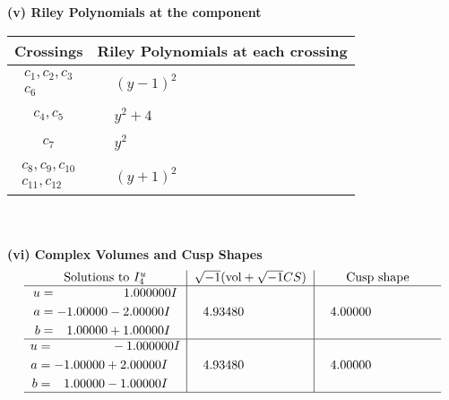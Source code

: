 \documentclass[1p]{elsarticle_modified}
\theoremstyle{definition}
\newcommand{\I}{\sqrt{-1}}
\begin{document}
\newpage\renewcommand{\arraystretch}{1}
\flushleft \textbf{(v) Riley Polynomials at the component}\newline \\
\begin{tabular}{m{50pt}|m{274pt}}
Crossings & \hspace{64pt}Riley Polynomials at each crossing \\
\hline $$\begin{aligned}c_{1},c_{2},c_{3}\\c_{6}\end{aligned}$$&$\begin{aligned}
&(y-1)^2
\end{aligned}$\\
\hline $$\begin{aligned}c_{4},c_{5}\end{aligned}$$&$\begin{aligned}
&y^2+4
\end{aligned}$\\
\hline $$\begin{aligned}c_{7}\end{aligned}$$&$\begin{aligned}
&y^2
\end{aligned}$\\
\hline $$\begin{aligned}c_{8},c_{9},c_{10}\\c_{11},c_{12}\end{aligned}$$&$\begin{aligned}
&(y+1)^2
\end{aligned}$\\
\hline
\end{tabular}\\~\\
\newpage\flushleft \textbf{(vi) Complex Volumes and Cusp Shapes}
$$\begin{array}{c|c|c}  
\text{Solutions to }I^u_{4}& \I (\text{vol} + \sqrt{-1}CS) & \text{Cusp shape}\\
 \hline 
\begin{aligned}
u &= \phantom{-0.000000 -}1.000000 I \\
a &= -1.00000 - 2.00000 I \\
b &= \phantom{-}1.00000 + 1.00000 I\end{aligned}
 & \phantom{-}4.93480\phantom{ +0.000000I} & \phantom{-}4.00000\phantom{ +0.000000I} \\ \hline\begin{aligned}
u &= \phantom{-0.000000 } -1.000000 I \\
a &= -1.00000 + 2.00000 I \\
b &= \phantom{-}1.00000 - 1.00000 I\end{aligned}
 & \phantom{-}4.93480\phantom{ +0.000000I} & \phantom{-}4.00000\phantom{ +0.000000I}\\
 \hline 
 \end{array}$$\newpage
\end{document}
